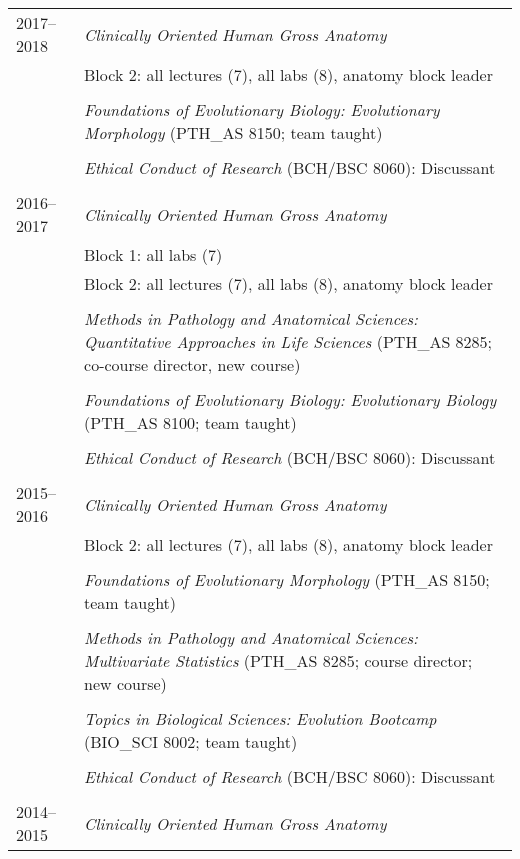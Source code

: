 \begin{longtable}{@{}lX@{}}
    \\
  2017--2018 & \textit{Clinically Oriented Human Gross Anatomy}\\
    & Block 2: all lectures (7), all labs (8), anatomy block leader\\
    \\
    & \textit{Foundations of Evolutionary Biology: Evolutionary Morphology} (PTH\_AS 8150; team taught)\\
    \\
    & \textit{Ethical Conduct of Research} (BCH/BSC 8060): Discussant\\
    \\
    2016--2017 & \textit{Clinically Oriented Human Gross Anatomy}\\
    & Block 1: all labs (7)\\
    & Block 2: all lectures (7), all labs (8), anatomy block leader\\
    \\
    & \textit{Methods in Pathology and Anatomical Sciences: Quantitative Approaches in Life Sciences} (PTH\_AS 8285; co-course director, new course)\\
    \\
    & \textit{Foundations of Evolutionary Biology: Evolutionary Biology} (PTH\_AS 8100; team taught)\\
    \\
    & \textit{Ethical Conduct of Research} (BCH/BSC 8060): Discussant\\
    \\
  2015--2016 & \textit{Clinically Oriented Human Gross Anatomy}\\
    & Block 2: all lectures (7), all labs (8), anatomy block leader\\
    \\
    & \textit{Foundations of Evolutionary Morphology} (PTH\_AS 8150; team taught)\\
    \\
    & \textit{Methods in Pathology and Anatomical Sciences: Multivariate Statistics} (PTH\_AS 8285; course director; new course)\\
    \\
    & \textit{Topics in Biological Sciences: Evolution Bootcamp} (BIO\_SCI 8002; team taught)\\
    \\
    & \textit{Ethical Conduct of Research} (BCH/BSC 8060): Discussant\\
    \\
  2014--2015& \textit{Clinically Oriented Human Gross Anatomy}\\

\end{longtable}
